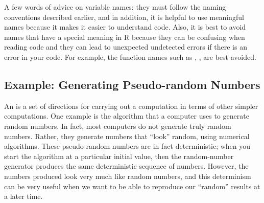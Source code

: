 A few words of advice on variable names: they must follow the naming
conventions described earlier, and in addition, it is helpful to use
meaningful names because it makes it easier to understand code.  Also,
it is best to avoid names that have a special meaning in R because
they can be confusing when reading code and they can lead to
unexpected undetected errors if there is an error in your code.  For
example, the function names such as , , 
are best avoided.

\subsection{Example: Generating Pseudo-random Numbers}
An  is a set of directions for carrying out a computation in
terms of other simpler computations. One example is the algorithm that
a computer uses to generate random numbers.  In fact, most computers
do not generate truly random numbers.  Rather, they generate numbers
that ``look'' random, using numerical algorithms.  These pseudo-random
numbers are in fact deterministic; when you start the algorithm at a
particular initial value, then the random-number generator produces
the same deterministic sequence of numbers.  However, the numbers
produced look very much like random numbers, and this determinism can
be very useful when we want to be able to reproduce our ``random''
results at a later time.


